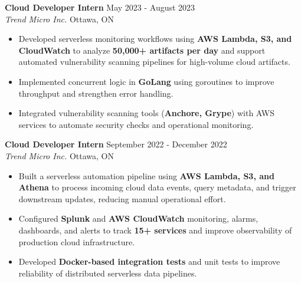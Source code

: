\documentclass[a4paper]{article}
\begin{document}
\textbf{Cloud Developer Intern} \hfill May 2023 - August 2023\\
\textit{Trend Micro Inc.} \hfill Ottawa, ON\\
\vspace{-2mm}
\begin{itemize} \itemsep -2pt
    \item Developed serverless monitoring workflows using \textbf{AWS Lambda, S3, and CloudWatch} to analyze \textbf{50,000+  artifacts per day} and support automated vulnerability scanning pipelines for high-volume cloud artifacts.


\item Implemented concurrent logic in \textbf{GoLang} using goroutines to improve throughput and strengthen error handling.

\item Integrated vulnerability scanning tools (\textbf{Anchore, Grype}) with AWS services to automate security checks and operational monitoring.
\end{itemize}

\textbf{Cloud Developer Intern} \hfill September 2022 - December 2022\\
\textit{Trend Micro Inc.} \hfill Ottawa, ON\\
\vspace{-2mm}
\begin{itemize} \itemsep -2pt
        \item Built a serverless automation pipeline using \textbf{AWS Lambda, S3, and Athena} to process incoming cloud data events, query metadata, and trigger downstream updates, reducing manual operational effort.


\item Configured \textbf{Splunk} and \textbf{AWS CloudWatch} monitoring, alarms, dashboards, and alerts to track \textbf{15+ services} and improve observability of production cloud infrastructure.

\item Developed \textbf{Docker-based integration tests} and unit tests to improve reliability of distributed serverless data pipelines.
\end{itemize}
\end{document}

